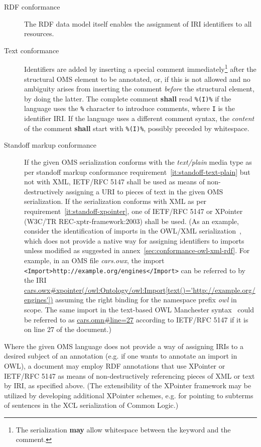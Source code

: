 \documentclass[10pt,fleqn,final]{scrreprt}
\makeatletter
\newcommand*{\eg}{e.g.\@\xspace}
\newcommand*{\mimetype}[1]{\textit{#1}}
\newcommand*{\shall}{\textbf{shall}\xspace}
\newcommand*{\may}{\textbf{may}\xspace}
\newcommand{\nisref}[1]{#1}
\newenvironment{definitions}[0]{\medskip }{}
\makeatother
\begin{document}
\begin{definitions}
\begin{description}
\item[RDF conformance] The RDF data model itself enables the assignment of IRI identifiers to all resources.
\item[Text conformance] Identifiers are added by inserting a special comment immediately\footnote{The serialization \may allow whitespace between the keyword and the comment.} after the structural OMS element to be annotated, or, if this is not allowed and no ambiguity arises from inserting the comment \emph{before} the structural element, by doing the latter.  The complete comment \shall read \texttt{\%(I)\%} if the language uses the \texttt{\%} character to introduce comments, where \texttt{I} is the identifier IRI.  If the language uses a different comment syntax, the \emph{content} of the comment \shall start with \texttt{\%(I)\%}, possibly preceded by whitespace.
\item[Standoff markup conformance] If the given OMS serialization conforms with the \mimetype{text/plain} media type as per standoff markup conformance requirement~\ref{it:standoff-text-plain} but not with XML, \nisref{IETF/RFC 5147} shall be used as means of non-destructively assigning a URI to pieces of text in the given OMS serialization.
If the serialization conforms with XML as per requirement~\ref{it:standoff-xpointer}, one of \nisref{IETF/RFC 5147} or XPointer (\nisref{W3C/TR REC-xptr-framework:2003}) shall be used. { (As an example, consider the identification of imports in the OWL/XML serialization~\cite{W3C:REC-owl2-xml-serialization-20121211}, which does not provide a native way for assigning identifiers to imports unless modified as suggested in annex~\ref{sec:conformance-owl-xml-rdf}.  For example, in an OMS file \textit{cars.owx}, the import \texttt{<Import>http://example.org/engines</Import>} can be referred to by the IRI \url{cars.owx\#xpointer(/owl:Ontology/owl:Import[text()='http://example.org/engines'])} assuming the right binding for the namespace prefix \textit{owl} in scope.
The same import in the text-based OWL Manchester syntax~\cite{W3C:NOTE-owl2-manchester-syntax-20091027} could be referred to as \url{cars.omn\#line=27} according to \nisref{IETF/RFC 5147} if it is on line 27 of the document.)}
\end{description}

Where the given OMS language does not provide a way of assigning IRIs to a desired subject of an annotation (\eg if one wants to annotate an import in OWL), a document may employ RDF annotations that use XPointer or \nisref{IETF/RFC 5147} as means of non-destructively referencing pieces of XML or text by IRI, as specified above. (The extensibility of the XPointer framework may be utilized by developing additional XPointer schemes, \eg for pointing to subterms of sentences in the XCL serialization of Common Logic.) 


\end{definitions}
\end{document}

